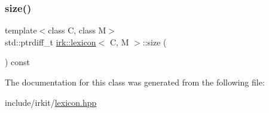 \mbox{\label{classirk_1_1lexicon_a2503eaf2cdd72cb08aa7121edc875a3f}} 
\subsubsection{\texorpdfstring{size()}{size()}}
{\footnotesize\ttfamily template$<$class C, class M$>$ \\
std\+::ptrdiff\+\_\+t \mbox{\hyperlink{classirk_1_1lexicon}{irk\+::lexicon}}$<$ C, M $>$\+::size (\begin{DoxyParamCaption}{ }\end{DoxyParamCaption}) const\hspace{0.3cm}{\ttfamily [inline]}}



The documentation for this class was generated from the following file\+:\begin{DoxyCompactItemize}
\item 
include/irkit/\mbox{\hyperlink{lexicon_8hpp}{lexicon.\+hpp}}\end{DoxyCompactItemize}
